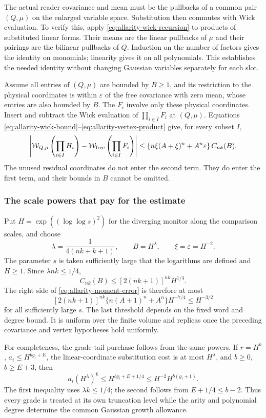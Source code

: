 The actual reader covariance and mean must be the pullbacks of a common
pair $(Q,\mu)$ on the enlarged variable space. Substitution then commutes
with Wick evaluation. To verify this, apply
\eqref{eq:allarity-wick-recursion} to products of substituted linear
forms. Their means are the linear pullbacks of $\mu$ and their pairings
are the bilinear pullbacks of $Q$. Induction on the number of factors
gives the identity on monomials; linearity gives it on all polynomials.
This establishes the needed identity without changing Gaussian variables
separately for each slot.

Assume all entries of $(Q,\mu)$ are bounded by $B\ge1$, and its
restriction to the physical coordinates is within $\varepsilon$ of
the free covariance with zero mean, whose entries are also bounded by
$B$. The $F_i$ involve only these physical coordinates. Insert and
subtract the Wick evaluation of $\prod_{i\in I}F_i$ at $(Q,\mu)$.
Equations \eqref{eq:allarity-wick-bound}--\eqref{eq:allarity-vertex-product}
give, for every subset $I$,
\begin{equation}\label{eq:allarity-moment-error}
 \left|\mathcal W_{Q,\mu}\left(\prod_{i\in I}H_i\right)
       -\mathcal W_{\rm free}\left(\prod_{i\in I}F_i\right)\right|
 \le\{n\xi(A+\xi)^n+A^n\varepsilon\}\,C_{nk}(B).
\end{equation}
The unused residual coordinates do not enter the second term. They do
enter the first term, and their bounds in $B$ cannot be omitted.

\subsubsection{The scale powers that pay for the estimate}

Put $H=\exp((\log\log s)^2)$ for the diverging monitor along the
comparison scales, and choose
\[
 \lambda=\frac1{4(nk+k+1)},\qquad
 B=H^\lambda,\qquad \xi=\varepsilon=H^{-2}.
\]
The parameter $s$ is taken sufficiently large that the logarithms are
defined and $H\ge1$. Since $\lambda nk\le1/4$,
\[
 C_{nk}(B)\le [2(nk+1)]^{nk}H^{1/4}.
\]
The right side of \eqref{eq:allarity-moment-error} is therefore at most
\[
 [2(nk+1)]^{nk}\{n(A+1)^n+A^n\}H^{-7/4}
                  \le H^{-3/2}
\]
for all sufficiently large $s$. The last threshold depends on the fixed
word and degree bound. It is uniform over the finite volume and replicas
once the preceding covariance and vertex hypotheses hold uniformly.

For completeness, the grade-tail purchase follows from the same powers.
If $r=H^b$, $a_i\le H^{b g_i+E}$, the linear-coordinate substitution
cost is at most $H^\lambda$, and $b\ge0$, $b\ge E+3$, then
\[
 a_i(H^\lambda)^k
   \le H^{b g_i+E+1/4}
   \le H^{-2}H^{b(g_i+1)}.
\]
The first inequality uses $\lambda k\le1/4$; the second follows from
$E+1/4\le b-2$. Thus every grade is treated at its own truncation
level while the arity and polynomial degree determine the common
Gaussian growth allowance.

